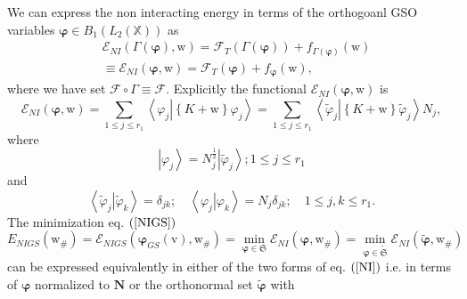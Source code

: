 \documentclass[aps,preprint]{revtex4}%
\begin{document}
We can express the non interacting energy in terms of the orthogoanl GSO
variables $\mathbf{\varphi\in}B_{1}\left(  L_{2}\left(  \mathbb{X}\right)
\right)  $ as
\begin{align}
&  \mathcal{E}_{NI}\left(  \Gamma\left(  \mathbf{\varphi}\right)
\mathbf{,}\mathrm{w}\right)  =\mathcal{F}_{T}\left(  \Gamma\left(
\mathbf{\varphi}\right)  \right)  +f_{\Gamma\left(  \mathbf{\varphi}\right)
}\left(  \mathrm{w}\right) \nonumber\\
&  \equiv\mathcal{E}_{NI}\left(  \mathbf{\varphi,}\mathrm{w}\right)
=\mathcal{F}_{T}\left(  \mathbf{\varphi}\right)  +f_{\mathbf{\varphi}}\left(
\mathrm{w}\right)  ,
\end{align}
where we have set $\mathcal{F}\circ\Gamma\equiv\mathcal{F}.$ Explicitly the
functional $\mathcal{E}_{NI}\left(  \mathbf{\varphi,}\mathrm{w}\right)  $ is
\begin{equation}
\mathcal{E}_{NI}\left(  \mathbf{\varphi,}\mathrm{w}\right)  =\sum_{1\leq j\leq
r_{1}}\left\langle \varphi_{j}\left\vert \left\{  K+\mathrm{w}\right\}
\varphi_{j}\right.  \right\rangle =\sum_{1\leq j\leq r_{1}}\left\langle
\tilde{\varphi}_{j}\left\vert \left\{  K+\mathrm{w}\right\}  \tilde{\varphi
}_{j}\right.  \right\rangle N_{j}, \label{NI}%
\end{equation}
where
\begin{equation}
\left\vert \varphi_{j}\right\rangle =N_{j}^{\frac{1}{2}}\left\vert
\tilde{\varphi}_{j}\right\rangle ;1\leq j\leq r_{1}%
\end{equation}
and
\begin{equation}
\left\langle \tilde{\varphi}_{j}\left\vert \tilde{\varphi}_{k}\right.
\right\rangle =\delta_{jk};\quad\left\langle \varphi_{j}\left\vert \varphi
_{k}\right.  \right\rangle =N_{j}\delta_{jk};\quad1\leq j,k\leq r_{1}.
\end{equation}
The minimization eq. $\left(  \ref{NIGS}\right)  $
\begin{equation}
E_{NIGS}\left(  \mathrm{w}_{\#}\right)  =\mathcal{E}_{NIGS}\left(
\mathbf{\varphi}_{GS}\left(  \mathrm{v}\right)  \mathbf{,}\mathrm{w}%
_{\#}\right)  =\min_{\mathbf{\varphi\in}\mathfrak{S}}\mathcal{E}_{NI}\left(
\mathbf{\varphi,}\mathrm{w}_{\#}\right)  =\min_{\mathbf{\varphi\in
}\mathfrak{\tilde{S}}}\mathcal{E}_{NI}\left(  \mathbf{\tilde{\varphi}%
,}\mathrm{w}_{\#}\right)  \label{MNIGS}%
\end{equation}
can be expressed equivalently in either of the two forms of eq. $\left(
\ref{NI}\right)  $ i.e. in terms of $\mathbf{\varphi}$ normalized to
$\mathbf{N}$ or the orthonormal set $\mathbf{\tilde{\varphi}}$ with
\end{document}
